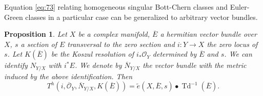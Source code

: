\documentclass[10pt,twoside]{article}
\numberwithin{equation}{section}
\theoremstyle{plain}
\newtheorem{proposition}[equation]{Proposition}
\theoremstyle{definition}
\DeclareMathOperator{\Td}{Td}
\begin{document}
Equation \eqref{eq:73} relating homogeneous singular Bott-Chern classes and
Euler-Green classes in a particular case can be generalized to
arbitrary vector bundles.

\begin{proposition} \label{prop:10}
  Let $X$ be a complex manifold, $\overline E$ a hermitian
  vector bundle over $X$, $s$ a section of $E$ transversal to the zero
  section and $i\colon Y\longrightarrow X$ the zero locus of $s$. Let
  $K(\overline E)$ be the 
  Koszul resolution of $i_{\ast}\mathcal{O}_{Y}$ determined by
  $\overline E$ and $s$. We can identify $N_{Y/X}$ with
  $i^{\ast}E$. We denote by $\overline N_{Y/X}$ the vector bundle with
  the metric induced by the above identification. Then 
  \begin{displaymath}
    T^{h}(i,\overline {\mathcal{O}}_{Y},\overline N_{Y/X},K(\overline
    E))=\widetilde e(X,\overline E,s)\bullet 
    \Td^{-1}(\overline E).
  \end{displaymath}
\end{proposition}
\end{document}

